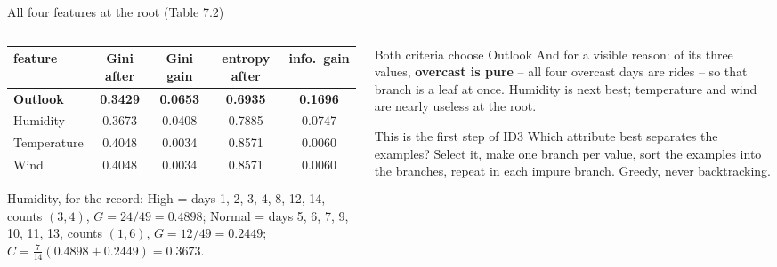 \documentclass[10pt,aspectratio=169]{beamer}
\begin{document}
\begin{frame}{All four features at the root (Table 7.2)}
\begin{columns}[T]
\begin{column}{0.56\textwidth}
\begin{center}
\footnotesize\setlength{\tabcolsep}{2.5pt}
\begin{tabular}{lcccc}\toprule
feature & Gini after & Gini gain & entropy after & info.\ gain\\\midrule
\textbf{Outlook} & \textbf{0.3429} & \textbf{0.0653} & \textbf{0.6935} & \textbf{0.1696}\\
Humidity & 0.3673 & 0.0408 & 0.7885 & 0.0747\\
Temperature & 0.4048 & 0.0034 & 0.8571 & 0.0060\\
Wind & 0.4048 & 0.0034 & 0.8571 & 0.0060\\\bottomrule
\end{tabular}
\end{center}
\footnotesize
Humidity, for the record: High = days 1, 2, 3, 4, 8, 12, 14, counts $(3,4)$,
$G=24/49=0.4898$; Normal = days 5, 6, 7, 9, 10, 11, 13, counts $(1,6)$,
$G=12/49=0.2449$; $C=\tfrac{7}{14}(0.4898+0.2449)=0.3673$.
\end{column}
\begin{column}{0.42\textwidth}
\small
\begin{block}{Both criteria choose Outlook}
And for a visible reason: of its three values, \textbf{overcast is pure} --
all four overcast days are rides -- so that branch is a leaf at once.
Humidity is next best; temperature and wind are nearly useless at the root.
\end{block}
\begin{block}{This is the first step of ID3}
Which attribute best separates the examples?  Select it, make one branch per
value, sort the examples into the branches, repeat in each impure branch.
Greedy, never backtracking.
\end{block}
\end{column}
\end{columns}
\end{frame}
\end{document}
